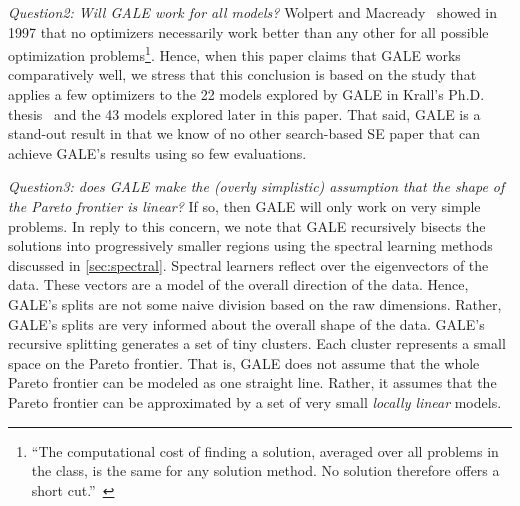 \documentclass[10pt,journal,compsoc]{IEEEtran}
\newcommand{\tion}[1]{\textsection\ref{sec:#1}}
\newenvironment{changed}{\par\color{MyDarkBlue}}{\par}
\begin{document}
\begin{changed}
{\em Question2: Will GALE work for all models?}
Wolpert and Macready~\cite{wolpert97} showed in 1997
that no optimizers necessarily work better than any
other for all possible optimization
problems\footnote{``The computational
  cost of finding a solution, averaged over all
  problems in the class, is the same for any
  solution method.  No solution therefore offers a
  short cut.''~\cite{wolpert97}}. Hence, when this paper claims that
GALE works comparatively well, we  stress that this conclusion 
is based on the study that applies a few optimizers to the
22 models explored by GALE in Krall's Ph.D. thesis~\cite{krall14f}
and the 43 models explored later in this paper.
That said, GALE is a stand-out result in that we know of no other search-based
SE paper that can achieve GALE's results using so few evaluations.


{\em Question3: does GALE make the (overly simplistic) assumption
that the shape of the Pareto frontier is linear?}  If so, then GALE will
only work on very simple problems.
In reply to this concern, we note that GALE
recursively bisects the solutions into progressively
smaller regions using the spectral learning methods 
discussed in \tion{spectral}. Spectral learners
reflect over the eigenvectors of the data.
These vectors are a model of the overall direction of the
data.  Hence, GALE's splits are not some naive division based
on the raw dimensions. Rather, GALE's splits are very informed about the overall
shape of the data.
GALE's recursive splitting generates a set of
tiny clusters. Each cluster   represents a small space
on the Pareto frontier.  That is, GALE does not
assume that the whole Pareto frontier can be modeled
as one straight line. Rather, it assumes that the
Pareto frontier can be approximated by a set of very
small {\em locally linear} models.

\end{changed}

\newcommand{\Yes}{\ding{51}}
\newcommand{\No}{\ding{55}}
\end{document}
